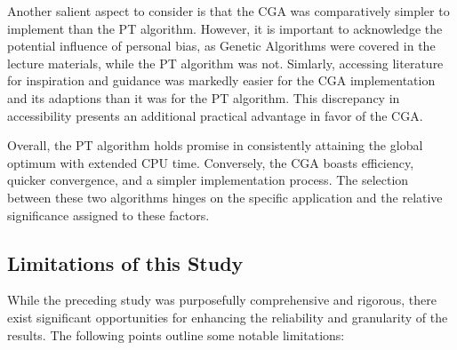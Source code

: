 \documentclass[10pt]{article}
\begin{document}
\begin{multicols}{2}
Another salient aspect to consider is that the CGA was comparatively simpler to implement than the PT algorithm. However, it is important to acknowledge the potential influence of personal bias, as Genetic Algorithms were covered in the lecture materials, while the PT algorithm was not. Simlarly, accessing literature for inspiration and guidance was markedly easier for the CGA implementation and its adaptions than it was for the PT algorithm. This discrepancy in accessibility presents an additional practical advantage in favor of the CGA.

Overall, the PT algorithm holds promise in consistently attaining the global optimum with extended CPU time. Conversely, the CGA boasts efficiency, quicker convergence, and a simpler implementation process. The selection between these two algorithms hinges on the specific application and the relative significance assigned to these factors.

\subsection{Limitations of this Study}

While the preceding study was purposefully comprehensive and rigorous, there exist significant opportunities for enhancing the reliability and granularity of the results. The following points outline some notable limitations:


\end{multicols}
\end{document}
